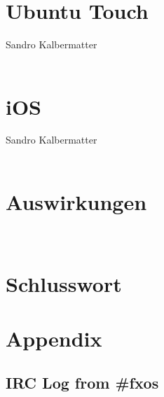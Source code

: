\documentclass[a4paper,10pt,titlepage,twoside]{article}
\begin{document}
\begin{multicols*}{2}
		\section{Ubuntu Touch}
		{\scriptsize Sandro Kalbermatter}\\
		{\normalsize \mbox{}}\\
		
		\newline
		\newline
		
		\section{iOS}
		{\scriptsize Sandro Kalbermatter}\\
		{\normalsize \mbox{}}\\
		
		\pagebreak
		
		\section {Auswirkungen}
		{\normalsize \mbox{}}\\
		
		\newline
		\newline
				
		\section{Schlusswort}
		
		\pagebreak
		
		\printbibliography
	\end{multicols*}
		
	\pagebreak
	
	\section{Appendix}
	\subsection{IRC Log from \#fxos}
		
\end{document}
